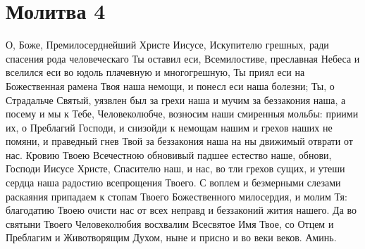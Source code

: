 \shortpage[2]
\section{Молитва 4}\begin{mymulticols}



О, Боже, Премилосерднейший Христе Иисусе, Искупителю грешных, ради спасения рода человеческаго Ты оставил еси, Всемилостиве, преславная Небеса и вселился еси во юдоль плачевную и многогрешную, Ты приял еси на Божественная рамена Твоя наша немощи, и понесл еси наша болезни; Ты, о Страдальче Святый, уязвлен был за грехи наша и мучим за беззакония наша, а посему и мы к Тебе, Человеколюбче, возносим наши смиренныя мольбы: приими их, о Преблагий Господи, и снизойди к немощам нашим и грехов наших не помяни, и праведный гнев Твой за беззакония наша на ны движимый отврати от нас. Кровию Твоею Всечестною обновивый падшее естество наше, обнови, Господи Иисусе Христе, Спасителю наш, и нас, во тли грехов сущих, и утеши сердца наша радостию всепрощения Твоего. С воплем и безмерными слезами раскаяния припадаем к стопам Твоего Божественного милосердия, и молим Тя: благодатию Твоею очисти нас от всех неправд и беззаконий жития нашего. Да во святыни Твоего Человеколюбия восхвалим Всесвятое Имя Твое, со Отцем и Преблагим и Животворящим Духом, ныне и присно и во веки веков. Аминь.


\end{mymulticols}

\mychapterending





